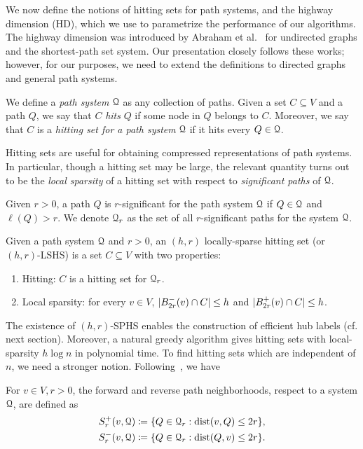 
We now define the notions of hitting sets for path systems, and the highway dimension (HD), which we use to parametrize the performance of our algorithms. The highway dimension was introduced by Abraham et al.~\citet{highway2010,highway2013} for undirected graphs and the shortest-path set system. Our presentation closely follows these works; however, for our purposes, we need to extend the definitions to directed graphs and general path systems.


We define a \emph{path system} $\mathcal{Q}$ as any collection of paths. Given a set $C\subseteq V$ and a path $Q$, we say that $C$ \emph{hits} $Q$ if some node in $Q$ belongs to $C$. Moreover, we say that $C$ is a \emph{hitting set for a path system} $\mathcal{Q}$ if it hits every $Q\in\mathcal{Q}$.


Hitting sets are useful for obtaining compressed representations of path systems. In particular, though a hitting set may be large, the relevant quantity turns out to be the \emph{local sparsity} of a hitting set with respect to \emph{significant paths} of $\mathcal{Q}$. 
\begin{definition}
Given $r>0$, a path $Q$ is $r$-significant for the path system $\mathcal{Q}$ if $Q\in\mathcal{Q}$ and $\ell(Q)>r$.
We denote $\mathcal{Q}_r$ as the set of all $r$-significant paths for the system $\mathcal{Q}$.
\end{definition}
\begin{definition}
Given a path system $\mathcal{Q}$ and $r>0$, an $(h,r)$ locally-sparse hitting set (or $(h,r)$-LSHS) is a set $C\subseteq V$ with two properties: 
\begin{enumerate}[nosep]
\item Hitting: $C$ is a hitting set for $\mathcal{Q}_r$.
\item Local sparsity: for every $v\in V$, $\lvert B^-_{2r}(v)\cap C\rvert\leq h$ and $\lvert B^+_{2r}(v)\cap C\rvert\leq h$.
\end{enumerate}
\end{definition}
The existence of $(h,r)$-SPHS enables the construction of efficient hub labels (cf. next section). Moreover, a natural greedy algorithm gives hitting sets with local-sparsity $h\log n$ in polynomial time. To find hitting sets which are independent of $n$, we need a stronger notion. Following~\citep{highway2013}, we have
\begin{definition}
For $v\in V, r>0$, the forward and reverse path neighborhoods, respect to a system $\mathcal{Q}$, are defined as 
\begin{align*}
S_r^+(v,\mathcal{Q}) &\coloneqq\{Q\in\mathcal{Q}_r: \mbox{dist}(v,Q)\leq 2r \}, \\  
S_r^-(v,\mathcal{Q}) &\coloneqq\{Q\in\mathcal{Q}_r: \mbox{dist}(Q,v)\leq 2r \}.
\end{align*}
\end{definition}


